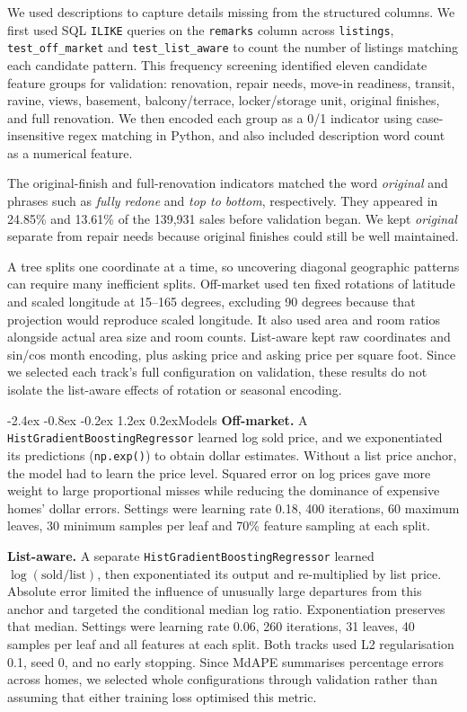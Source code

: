\documentclass[11pt,a4paper]{article}
\makeatletter
\renewcommand\section{\@startsection{section}{1}{\z@}
  {-2.4ex \@plus -0.8ex \@minus -0.2ex}
  {1.2ex \@plus 0.2ex}{\normalfont\Large\bfseries}}
\makeatother
\begin{document}
We used descriptions to capture details missing from the structured columns. We first used SQL
\texttt{ILIKE} queries on the \texttt{remarks} column across \verb|listings|,
\verb|test_off_market| and \verb|test_list_aware| to count the number of listings matching each candidate pattern.
This frequency screening identified eleven candidate feature groups for validation: renovation,
repair needs, move-in readiness, transit, ravine, views, basement, balcony/terrace, locker/storage
unit, original finishes, and full renovation. We then encoded each group as a 0/1 indicator using
case-insensitive regex matching in Python, and also included description word count as a
numerical feature.

The original-finish and full-renovation indicators matched the word \textit{original} and phrases
such as \textit{fully redone} and \textit{top to bottom}, respectively. They appeared in 24.85\% and 13.61\%
of the 139,931 sales before validation began. We kept \textit{original} separate from repair needs
because original finishes could still be well maintained.

A tree splits one coordinate at a time, so uncovering diagonal geographic patterns can require many inefficient splits.
Off-market used ten fixed rotations of latitude and scaled longitude at 15--165 degrees,
excluding 90 degrees because that projection would reproduce scaled longitude.
It also used area and room ratios alongside actual area size and room counts. List-aware kept raw
coordinates and sin/cos month encoding, plus asking price and asking price per square foot.
Since we selected each track's full configuration on validation, these results do not isolate
the list-aware effects of rotation or seasonal encoding.

\newpage
\section{Models}
\textbf{Off-market.} A \texttt{HistGradientBoostingRegressor} learned log sold price, and we
exponentiated its predictions (\verb|np.exp()|) to obtain dollar estimates. Without a list price anchor, the model had to learn the price level.
Squared error on log prices gave more weight to large proportional misses while reducing the
dominance of expensive homes' dollar errors. Settings were learning rate 0.18, 400 iterations,
60 maximum leaves, 30 minimum samples per leaf and 70\% feature sampling at each split.

\textbf{List-aware.} A separate \texttt{HistGradientBoostingRegressor} learned $\log(\mathrm{sold}/\mathrm{list})$, then
exponentiated its output and re-multiplied by list price. Absolute error limited the influence of
unusually large departures from this anchor and targeted the conditional median log ratio.
Exponentiation preserves that median. Settings were learning rate 0.06,
260 iterations, 31 leaves, 40 samples per leaf and all features at each split. Both tracks used L2
regularisation 0.1, seed 0, and no early stopping. Since MdAPE summarises percentage errors across
homes, we selected whole configurations through validation rather than assuming that either training
loss optimised this metric.
\end{document}
